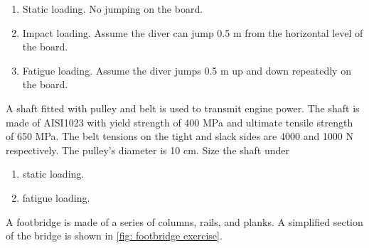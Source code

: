 \documentclass[
10pt,
a4paper,
openany,
svgnames,
]{book}
\newcommand{\exercise}{%
\item \label{lab:\arabic{chapter}.\arabic{exercisesi}}  %
}
\begin{document}
\begin{exercises}
  \begin{enumerate}
  \item Static loading. No jumping on the board.
  \item Impact loading. Assume the diver can jump 0.5 m from the horizontal level of the board.
  \item Fatigue loading. Assume the diver jumps 0.5 m up and down repeatedly on the board.
  \end{enumerate}
  
  \exercise A shaft fitted with pulley and belt is used to transmit engine power. The shaft is made of AISI1023 with yield strength of 400 MPa and ultimate tensile strength of 650 MPa. The belt tensions on the tight and slack sides are 4000 and 1000 N respectively. The pulley’s diameter is 10 cm. Size the shaft under

  \begin{figure}[H]
    \centering
  \end{figure}
  
  \begin{enumerate}
  \item static loading.
  \item fatigue loading.
  \end{enumerate}

  \exercise \label{exercise: footbridge} A footbridge is made of a series of columns, rails, and planks. A simplified section of the bridge is shown in \cref{fig: footbridge exercise}.


\end{exercises}
\end{document}
